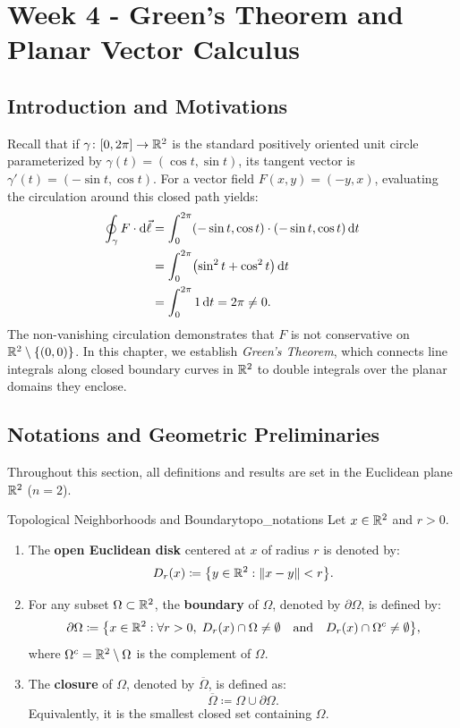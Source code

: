 \chapter{Week 4 - Green's Theorem and Planar Vector Calculus}

\section{Introduction and Motivations}

Recall that if $\gamma \colon [0, 2\pi] \to \mathbb{R}^2$ is the standard positively oriented unit circle parameterized by $\gamma(t) = (\cos t, \sin t)$, its tangent vector is $\gamma'(t) = (-\sin t, \cos t)$. For a vector field $F(x,y) = (-y, x)$, evaluating the circulation around this closed path yields:
\begin{align*}
    \oint_{\gamma} F \cdot \mathrm{d}\vec{\ell} &= \int_{0}^{2\pi} (-\sin t, \cos t) \cdot (-\sin t, \cos t) \,\mathrm{d}t \\
    &= \int_{0}^{2\pi} \bigl(\sin^2 t + \cos^2 t\bigr) \,\mathrm{d}t \\
    &= \int_{0}^{2\pi} 1 \,\mathrm{d}t = 2\pi \neq 0.
\end{align*}
The non-vanishing circulation demonstrates that $F$ is not conservative on $\mathbb{R}^2 \setminus \{(0,0)\}$. In this chapter, we establish \emph{Green's Theorem}, which connects line integrals along closed boundary curves in $\mathbb{R}^2$ to double integrals over the planar domains they enclose.

\section{Notations and Geometric Preliminaries}

Throughout this section, all definitions and results are set in the Euclidean plane $\mathbb{R}^2$ ($n = 2$).

\begin{definition}{Topological Neighborhoods and Boundary}{topo_notations}
Let $x \in \mathbb{R}^2$ and $r > 0$.
\begin{enumerate}
    \item The \textbf{open Euclidean disk} centered at $x$ of radius $r$ is denoted by:
    \[D_r(x) \coloneqq \bigl\{ y \in \mathbb{R}^2 : \left\lVert x - y\right\rVert < r \bigr\}.\]
    \item For any subset $\Omega \subset \mathbb{R}^2$, the \textbf{boundary} of $\Omega$, denoted by $\partial\Omega$, is defined by:
    \[\partial\Omega \coloneqq \bigl\{ x \in \mathbb{R}^2 : \forall r > 0, \; D_r(x) \cap \Omega \neq \emptyset \quad \text{and} \quad D_r(x) \cap \Omega^c \neq \emptyset \bigr\},\]
    where $\Omega^c = \mathbb{R}^2 \setminus \Omega$ is the complement of $\Omega$.
    \item The \textbf{closure} of $\Omega$, denoted by $\overline{\Omega}$, is defined as:
    \[\overline{\Omega} \coloneqq \Omega \cup \partial\Omega.\]
    Equivalently, it is the smallest closed set containing $\Omega$.
\end{enumerate}
\end{definition}


